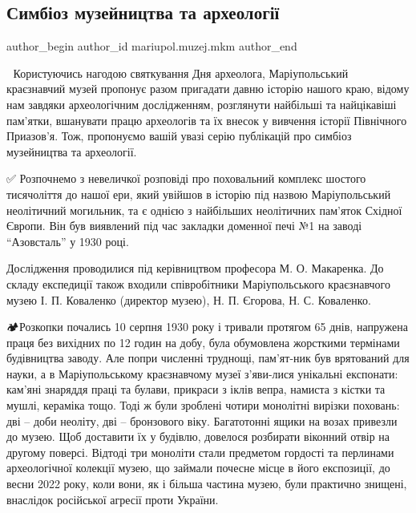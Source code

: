  
 
 
 
 

\subsection{Симбіоз музейництва та археології}
\label{sec:13_08_2023.fb.mariupol.muzej.mkm.1.symbioz_muzejnyctva_ta_arheologii}

\ifcmt
 author_begin
   author_id mariupol.muzej.mkm
 author_end
\fi

📍 Користуючись нагодою святкування Дня археолога, Маріупольський краєзнавчий
музей пропонує разом пригадати давню історію нашого краю, відому нам завдяки
археологічним дослідженням, розглянути найбільші та найцікавіші пам'ятки,
вшанувати працю археологів та їх внесок у вивчення історії Північного
Приазов'я. Тож, пропонуємо вашій увазі серію публікацій про симбіоз музейництва
та археології.

✅️ Розпочнемо з невеличкої розповіді про поховальний комплекс шостого
тисячоліття до нашої ери, який увійшов в історію під назвою Маріупольський
неолітичний могильник, та є однією з найбільших неолітичних пам'яток Східної
Європи. Він був виявлений під час закладки доменної печі №1 на заводі
\enquote{Азовсталь} у 1930 році.

Дослідження проводилися під керівництвом професора М. О. Макаренка. До складу
експедиції також входили співробітники Маріупольського краєзнавчого музею І. П.
Коваленко (директор музею), Н. П. Єгорова, Н. С. Коваленко.

🏕Розкопки почались 10 серпня 1930 року і тривали протягом 65 днів, напружена
праця без вихідних по 12 годин на добу, була обумовлена жорсткими термінами
будівництва заводу. Але попри численні труднощі, пам'ят\hyp{}ник був врятований для
науки, а в Маріупольському краєзнавчому музеї з'яви\hyp{}лися унікальні експонати:
кам'яні знаряддя праці та булави, прикраси з іклів вепра, намиста з кістки та
мушлі, кераміка тощо. Тоді ж були зроблені чотири монолітні вирізки поховань:
дві – доби неоліту, дві – бронзового віку. Багатотонні ящики на возах привезли
до музею. Щоб доставити їх у будівлю, довелося розбирати віконний отвір на
другому поверсі. Відтоді три моноліти стали предметом гордості та перлинами
археологічної колекції музею, що займали почесне місце в його експозиції, до
весни 2022 року, коли вони, як і більша частина музею, були практично знищені,
внаслідок російської агресії проти України.

